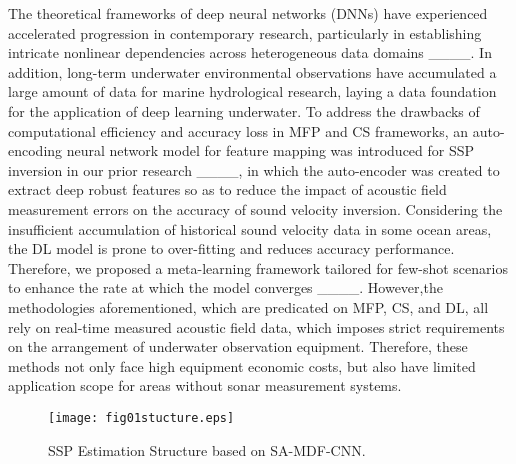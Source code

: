 The theoretical frameworks of deep neural networks (DNNs) have experienced accelerated progression in contemporary research, particularly in establishing intricate nonlinear dependencies across heterogeneous data domains ____. In addition, long-term underwater environmental observations have accumulated a large amount of data for marine hydrological research, laying a data foundation for the application of deep learning underwater. To address the drawbacks of computational efficiency and accuracy loss in MFP and CS frameworks, an auto-encoding neural network model for feature mapping was introduced for SSP inversion in our prior research ____, in which the auto-encoder was created to extract deep robust features so as to reduce the impact of acoustic field measurement errors on the accuracy of sound velocity inversion. Considering the insufficient accumulation of historical sound velocity data in some ocean areas, the DL model is prone to over-fitting and reduces accuracy performance. Therefore, we proposed a meta-learning framework tailored for few-shot scenarios to enhance the rate at which the model converges ____. However,the methodologies aforementioned, which are predicated on MFP, CS, and DL, all rely on real-time measured acoustic field data, which imposes strict requirements on the arrangement of underwater observation equipment. Therefore, these methods not only face high equipment economic costs, but also have limited application scope for areas without sonar measurement systems.

\begin{figure*}[!htbp]
	\centering
	\texttt{[image: fig01stucture.eps]}
	\caption{SSP Estimation Structure based on SA-MDF-CNN.}
	\label{fig1}
\end{figure*}

